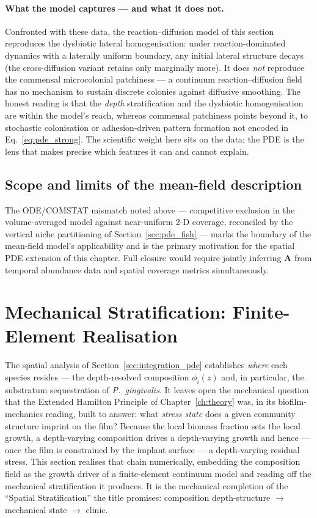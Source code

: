 \paragraph{What the model captures --- and what it does not.} Confronted with these
data, the reaction--diffusion model of this section reproduces the dysbiotic lateral
homogenisation: under reaction-dominated dynamics with a laterally uniform boundary,
any initial lateral structure decays (the cross-diffusion variant retains only
marginally more). It does \emph{not} reproduce the commensal microcolonial
patchiness --- a continuum reaction--diffusion field has no mechanism to sustain
discrete colonies against diffusive smoothing. The honest reading is that the
\emph{depth} stratification and the dysbiotic homogenisation are within the model's
reach, whereas commensal patchiness points beyond it, to stochastic colonisation or
adhesion-driven pattern formation not encoded in Eq.~\eqref{eq:pde_strong}. The
scientific weight here sits on the data; the PDE is the lens that makes precise
which features it can and cannot explain.

\subsection{Scope and limits of the mean-field description}
\label{sec:discussion_mismatch}

The ODE/COMSTAT mismatch noted above --- competitive exclusion in the volume-averaged
model against near-uniform 2-D coverage, reconciled by the vertical niche partitioning of
Section~\ref{sec:pde_fish} --- marks the boundary of the mean-field model's applicability and
is the primary motivation for the spatial PDE extension of this chapter. Full closure would
require jointly inferring $\mathbf{A}$ from temporal abundance data and spatial coverage
metrics simultaneously.

\section{Mechanical Stratification: Finite-Element Realisation}
\label{sec:integration_fem}

The spatial analysis of Section~\ref{sec:integration_pde} establishes \emph{where}
each species resides --- the depth-resolved composition $\phi_i(z)$ and, in
particular, the substratum sequestration of \textit{P.~gingivalis}. It leaves open
the mechanical question that the Extended Hamilton Principle of
Chapter~\ref{ch:theory} was, in its biofilm-mechanics reading, built to answer: what
\emph{stress state} does a given community structure imprint on the film? Because
the local biomass fraction sets the local growth, a depth-varying composition drives
a depth-varying growth and hence --- once the film is constrained by the implant
surface --- a depth-varying residual stress. This section realises that chain
numerically, embedding the composition field as the growth driver of a finite-element
continuum model and reading off the mechanical stratification it produces. It is the
mechanical completion of the ``Spatial Stratification'' the title promises:
composition depth-structure $\rightarrow$ mechanical state $\rightarrow$ clinic.

